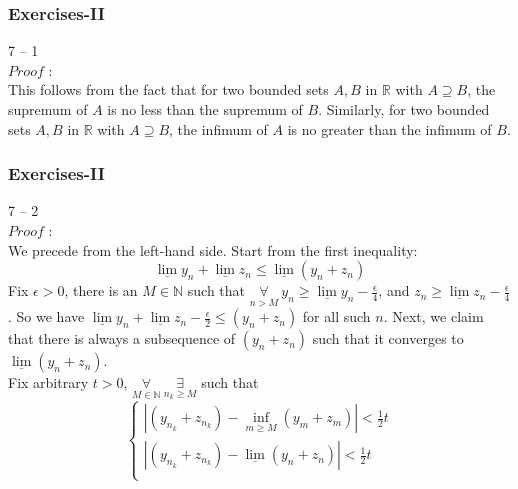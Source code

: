 \documentclass[12pt, t]{beamer}
\begin{document}
\begin{frame}
    \frametitle{Exercises-II}
    7 -- 1\\
    $Proof$ : \\
    \hspace{1em} This follows from the fact that for two bounded sets $A,B$ in $\mathbb{R}$ with $A\supseteq B$, the supremum of $A$ is no less than
    the supremum of $B$.  Similarly, for two bounded sets $A,B$ in $\mathbb{R}$ with $A\supseteq B$, the infimum of $A$ is no greater than the infimum of $B$.


\end{frame}

\begin{frame}
    \frametitle{Exercises-II}
    7 -- 2\\
    $Proof$ : \\
    \hspace{1em} We precede from the left-hand side. Start from the first inequality:
    \begin{equation*}
        \underline{\lim}y_n+\underline{\lim}z_n\leq \underline{\lim} (y_n+z_n)
    \end{equation*}
    \hspace{1em} Fix $\epsilon>0$, there is an $M\in \mathbb{N}$ such that $\underset{n>M}{\forall}\ y_n\geq \underline{\lim}y_n-\frac{\epsilon}{4}$, and
    $z_n \geq \underline{\lim}z_n-\frac{\epsilon}{4}$. So we have $\underline{\lim}y_n+\underline{\lim}z_n-\frac{\epsilon}{2}\leq(y_n+z_n)$ for all such $n$.
    Next, we claim that there is always a subsequence of $(y_n+z_n)$ such that it converges to $\underline{\lim}(y_n+z_n)$.\\
    \hspace{1em} Fix arbitrary $t>0$, $\underset{M\in\mathbb{N}}{\forall}\ \underset{n_k\geq M}{\exists}$ such that
    \begin{equation*}
        \begin{cases}
            |(y_{n_k}+z_{n_k})-\inf_{m\geq M}(y_m+z_m)|<\frac{1}{2}t   \\
            |(y_{n_k}+z_{n_k})-\underline{\lim}(y_n+z_n)|<\frac{1}{2}t \\
        \end{cases}
    \end{equation*}


\end{frame}
\end{document}
